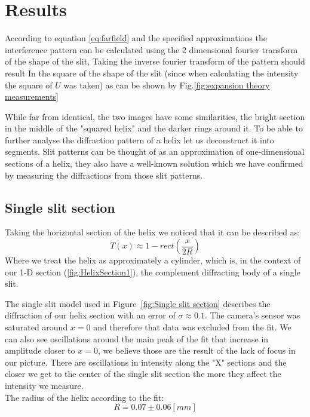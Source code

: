 \section{Results}\label{sec:results}
According to equation \eqref{eq:farfield} and the specified approximations the interference pattern can be calculated using
the 2 dimensional fourier transform of the shape of the slit, Taking the inverse fourier transform of the pattern should result
In the square of the shape of the slit (since when calculating the intensity the square of $U$ was taken)
as can be shown by Fig.\ref{fig:expansion theory measurements}


While far from identical, the two images have some similarities, the bright section in the middle of the "squared helix" and the darker rings around it.
To be able to further analyse the diffraction pattern of a helix let us deconstruct it into segments.
Slit patterns can be thought of as an approximation of one-dimensional sections of a helix, they also have a well-known solution which we have confirmed by measuring the diffractions from those slit patterns.



\subsection{Single slit section}
Taking the horizontal section of the helix we noticed that it can be described as:
\[T(x)\approx 1-rect\left(\frac{x}{2R}\right)\]
Where we treat the helix as approximately a cylinder, which is, in the context of our 1-D section (\ref{fig:HelixSection1}), the complement diffracting body of a single slit.

The single slit model used in Figure~\ref{fig:Single slit section} describes the diffraction of our helix section with an error of $\sigma\approx0.1$.
The camera's sensor was saturated around $x=0$ and therefore that data was excluded from the fit.
We can also see oscillations around the main peak of the fit that increase in amplitude closer to $x=0$, we believe those are the result of the lack of focus in our picture.
There are oscillations in intensity along the "X" sections and the closer we get to the center of the single slit section the more they affect the intensity we measure.
\\
The radius of the helix according to the fit:
\[R=0.07\pm0.06[mm]\]

